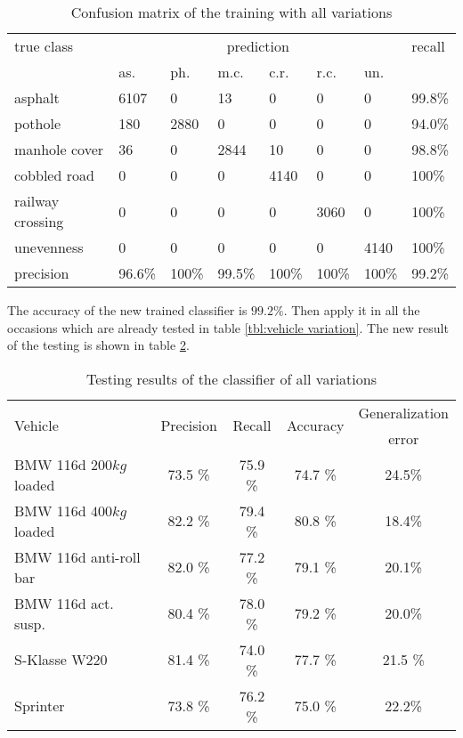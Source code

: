 \begin{table}
\centering
\caption{Confusion matrix of the training with all variations}
\label{tbl:class_all}
\begin{tabular}{llllllll}
\hline
true class & \multicolumn{6}{c}{prediction}  & recall 
 \\
                 & as.  & ph.  & m.c. & c.r. & r.c.  & un.   &     
 \\ \hline
asphalt          & 6107  & 0    & 13  & 0    & 0     & 0     & 99.8\%        \\
pothole          & 180    & 2880  & 0    & 0    & 0     & 0     & 94.0\%        \\
manhole cover    & 36   & 0    & 2844  & 10   & 0     & 0     & 98.8\%        \\
cobbled road     & 0   & 0    & 0    & 4140   & 0     & 0     & 100\%        \\
railway crossing & 0    & 0    & 0    & 0    & 3060   & 0     & 100\%       \\
unevenness       & 0    & 0    & 0    & 0    & 0     & 4140   & 100\%       \\ \hline
precision        & 96.6\% & 100\% & 99.5\% & 100\% & 100\% & 100\% & 99.2\%   
 \\ \hline
\end{tabular}
\end{table}

The accuracy of the new trained classifier is $99.2\%$.
%
Then apply it in all the occasions which are already tested in table \ref{tbl:vehicle variation}.
%
The new result of the testing is shown in table \ref{tbl:new_feature}.
 
\begin{table}
\centering
\caption{Testing results of the classifier of all variations}
\label{tbl:new_feature}
\begin{tabular}{lcccc}
\hline
\multirow{2}{*}{Vehicle} & \multirow{2}{*}{Precision} & \multirow{2}{*}{Recall} & \multirow{2}{*}{Accuracy} & Generalization \\
 & & & & error \\ \hline
BMW 116d $200kg$ loaded & 73.5 \% & 75.9 \% & 74.7 \% &  24.5\% \\
BMW 116d $400kg$ loaded & 82.2 \% & 79.4 \% & 80.8 \% &  18.4\% \\
BMW 116d anti-roll bar & 82.0 \% & 77.2 \% & 79.1 \% &  20.1\% \\
BMW 116d act. susp. & 80.4 \% & 78.0 \% & 79.2 \% &  20.0\% \\ 
S-Klasse W220 & 81.4 \% & 74.0 \% & 77.7 \% & 21.5 \% \\
Sprinter & 73.8 \% & 76.2 \% & 75.0 \% &  22.2\% \\ \hline
\end{tabular}
\end{table} 
 

